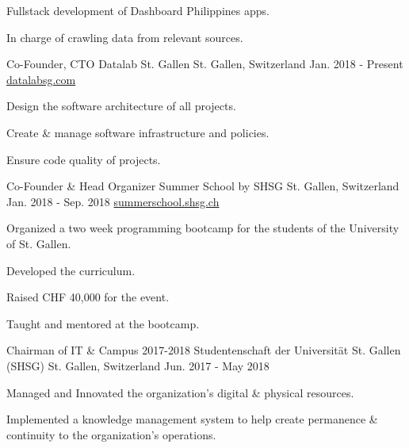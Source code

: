 \begin{cventries}
{\begin{cvitems}
      \item {Fullstack development of Dashboard Philippines apps.}
      \item {In charge of crawling data from relevant sources.}
      \end{cvitems}
    }
  \cventry
    {Co-Founder, CTO} %
    {Datalab St. Gallen} %
    {St. Gallen, Switzerland} %
    {Jan. 2018 - Present} %
    {\href{https://datalabsg.com}{datalabsg.com}} %
    {
      \begin{cvitems} %
      \item {Design the software architecture of all projects.}
      \item {Create \& manage software infrastructure and policies.}
      \item {Ensure code quality of projects.}
      \end{cvitems}
    }
  \cventry
    {Co-Founder \& Head Organizer} %
    {Summer School by SHSG} %
    {St. Gallen, Switzerland} %
    {Jan. 2018 - Sep. 2018} %
    {\href{https://summerschool.shsg.ch}{summerschool.shsg.ch}} %
    {
      \begin{cvitems} %
      \item {Organized a two week programming bootcamp for the students of the University of St. Gallen.}
      \item {Developed the curriculum.}
      \item {Raised CHF 40,000 for the event.}
      \item {Taught and mentored at the bootcamp.}
      \end{cvitems}
    }
  \cventry
    {Chairman of IT \& Campus 2017-2018} %
    {Studentenschaft der Universität St. Gallen (SHSG)} %
    {St. Gallen, Switzerland} %
    {Jun. 2017 - May 2018} %
    {} %
    {
      \begin{cvitems} %
        \item {Managed and Innovated the organization's digital \& physical resources.}
        \item {Implemented a knowledge management system to help create permanence \& continuity to the organization's operations.}

\end{cvitems}}
\end{cventries}
